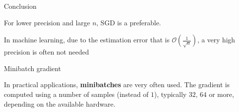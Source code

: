 \documentclass[usenames,dvipsnames,french]{beamer}
\begin{document}
\begin{frame}{Conclusion}
    
For lower precision and large $n$, SGD is a preferable.

    In machine learning, due to the estimation error that is $ \mathcal{O} (
\frac{1}{\sqrt{n} }) $, a very high precision is often not needed 
\end{frame}

\begin{frame}{Minibatch gradient}

    In practical applications, \textbf{minibatches} are very often used. The gradient is computed using a number of samples (instead of $1$), typically $32$, $64$ or more, depending on the available hardware.

\end{frame}
\end{document}
